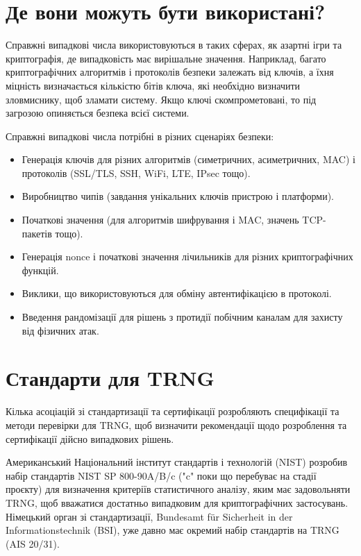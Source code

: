 \section{Де вони можуть бути використані?}

Справжні випадкові числа використовуються в таких сферах, як азартні ігри та криптографія, де випадковість має вирішальне значення. Наприклад, багато криптографічних алгоритмів і протоколів безпеки залежать від ключів, а їхня міцність визначається кількістю бітів ключа, які необхідно визначити зловмиснику, щоб зламати систему. Якщо ключі скомпрометовані, то під загрозою опиняється безпека всієї системи. 

Справжні випадкові числа потрібні в різних сценаріях безпеки:
\begin{itemize}
  \item Генерація ключів для різних алгоритмів (симетричних, асиметричних, MAC) і протоколів (SSL/TLS, SSH, WiFi, LTE, IPsec тощо).
  \item Виробництво чипів (завдання унікальних ключів пристрою і платформи).
  \item Початкові значення (для алгоритмів шифрування і MAC, значень TCP-пакетів тощо).
  \item Генерація nonce і початкові значення лічильників для різних криптографічних функцій.
  \item Виклики, що використовуються для обміну автентифікацією в протоколі.
  \item Введення рандомізації для рішень з протидії побічним каналам для захисту від фізичних атак.
\end{itemize}


\section{Стандарти для TRNG}

Кілька асоціацій зі стандартизації та сертифікації розробляють специфікації та методи перевірки для TRNG, щоб визначити рекомендації щодо розроблення та сертифікації дійсно випадкових рішень. 

Американський Національний інститут стандартів і технологій (NIST) розробив набір стандартів NIST SP 800-90A/B/c ("c" поки що перебуває на стадії проєкту) для визначення критеріїв статистичного аналізу, яким має задовольняти TRNG, щоб вважатися достатньо випадковим для криптографічних застосувань. Німецький орган зі стандартизації, Bundesamt für Sicherheit in der Informationstechnik (BSI), уже давно має окремий набір стандартів на TRNG (AIS 20/31). 

